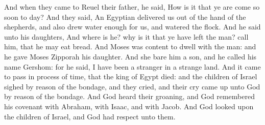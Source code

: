 \begin{biblechapter}
\verse And when they came to Reuel their father, he said, How is it that ye are come so soon to day?
\verse And they said, An Egyptian delivered us out of the hand of the shepherds, and also drew water enough for us, and watered the flock.
\verse And he said unto his daughters, And where is he? why is it that ye have left the man? call him, that he may eat bread.
\verse And Moses was content to dwell with the man: and he gave Moses Zipporah his daughter.
\verse And she bare him a son, and he called his name Gershom: for he said, I have been a stranger in a strange land.
\verse And it came to pass in process of time, that the king of Egypt died: and the children of Israel sighed by reason of the bondage, and they cried, and their cry came up unto God by reason of the bondage.
\verse And God heard their groaning, and God remembered his covenant with Abraham, with Isaac, and with Jacob.
\verse And God looked upon the children of Israel, and God had respect unto them.
\end{biblechapter}

\vfill\columnbreak %

